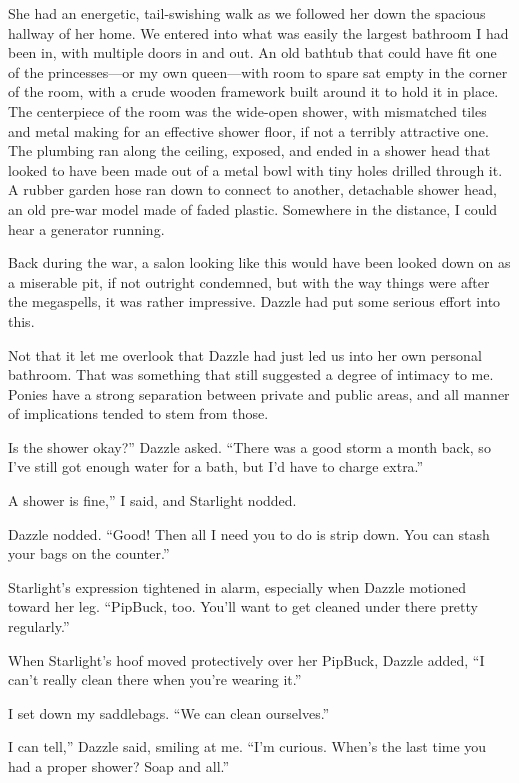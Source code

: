 She had an energetic, tail-swishing walk as we followed her down the spacious hallway of her home. We entered into what was easily the largest bathroom I had been in, with multiple doors in and out. An old bathtub that could have fit one of the princesses—or my own queen—with room to spare sat empty in the corner of the room, with a crude wooden framework built around it to hold it in place. The centerpiece of the room was the wide-open shower, with mismatched tiles and metal making for an effective shower floor, if not a terribly attractive one. The plumbing ran along the ceiling, exposed, and ended in a shower head that looked to have been made out of a metal bowl with tiny holes drilled through it. A rubber garden hose ran down to connect to another, detachable shower head, an old pre-war model made of faded plastic. Somewhere in the distance, I could hear a generator running.

Back during the war, a salon looking like this would have been looked down on as a miserable pit, if not outright condemned, but with the way things were after the megaspells, it was rather impressive. Dazzle had put some serious effort into this.

Not that it let me overlook that Dazzle had just led us into her own personal bathroom. That was something that still suggested a degree of intimacy to me. Ponies have a strong separation between private and public areas, and all manner of implications tended to stem from those.

\leavevmode{}Is the shower okay?” Dazzle asked. “There was a good storm a month back, so I’ve still got enough water for a bath, but I’d have to charge extra.”

\leavevmode{}A shower is fine,” I said, and Starlight nodded.

Dazzle nodded. “Good! Then all I need you to do is strip down. You can stash your bags on the counter.”

Starlight’s expression tightened in alarm, especially when Dazzle motioned toward her leg. “PipBuck, too. You’ll want to get cleaned under there pretty regularly.”

When Starlight’s hoof moved protectively over her PipBuck, Dazzle added, “I can’t really clean there when you’re wearing it.”

I set down my saddlebags. “We can clean ourselves.”

\leavevmode{}I can tell,” Dazzle said, smiling at me. “I’m curious. When’s the last time you had a proper shower? Soap and all.”

